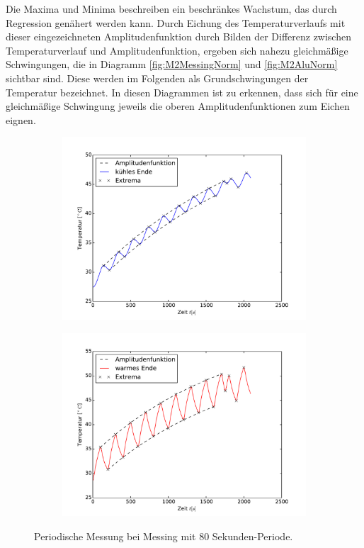 Die Maxima und Minima beschreiben ein beschränkes Wachstum, das durch Regression \cite{scipy} genähert werden kann.
Durch Eichung des Temperaturverlaufs mit dieser eingezeichneten Amplitudenfunktion durch Bilden der Differenz zwischen Temperaturverlauf und Amplitudenfunktion, ergeben sich nahezu gleichmäßige Schwingungen, die in Diagramm \ref{fig:M2MessingNorm} und \ref{fig:M2AluNorm} sichtbar sind. 
Diese werden im Folgenden als Grundschwingungen der Temperatur bezeichnet. 
In diesen Diagrammen ist zu erkennen, dass sich für eine gleichmäßige Schwingung jeweils die oberen Amplitudenfunktionen zum Eichen eignen.
\begin{figure}[h!]
	\centering
	\begin{subfigure}{0.9\textwidth}
	\includegraphics[width=\textwidth]{Bilder/M2_Messing_kuehl.pdf}
	\end{subfigure}
	\begin{subfigure}{0.9\textwidth}
	\includegraphics[width=\textwidth]{Bilder/M2_Messing_warm.pdf}
	\end{subfigure}
	\caption{Periodische Messung bei Messing mit 80 Sekunden-Periode.}
	\label{fig:M2Messing}
\end{figure}
